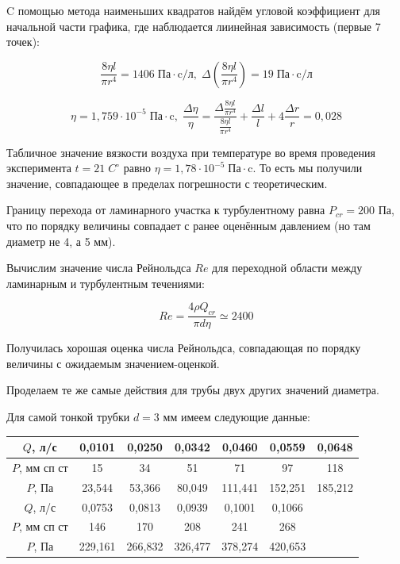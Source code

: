 \documentclass[a4paper, 12pt]{article} %
\begin{document}
C помощью метода наименьших квадратов найдём угловой коэффициент для начальной части графика, где наблюдается лиинейная зависимость (первые 7 точек):

\begin{equation}
    \frac{8\eta l}{\pi r^4} = 1406 \; \text{Па} \cdot \text{c/л}, \; \Delta \left( \frac{8\eta l}{\pi r^4} \right) = 19 \; \text{Па} \cdot \text{c/л}
\end{equation}

\begin{equation}
    \eta = 1,759 \cdot 10^{-5} \; \text{Па} \cdot \text{c}, \; \frac{\Delta \eta}{\eta} = \frac{\Delta \frac{8\eta l}{\pi r^4}}{\frac{8\eta l}{\pi r^4}} +  \frac{\Delta l}{l} + 4 \frac{\Delta r}{r} = 0,028
\end{equation}

Табличное значение вязкости воздуха при температуре во время проведения эксперимента $t = 21 \; C^{\circ}$ равно $\eta = 1,78 \cdot 10^{-5} \; \text{Па} \cdot \text{c}$. То есть мы получили значение, совпадающее в пределах погрешности с теоретическим.

Границу перехода от ламинарного участка к турбулентному равна $P_{cr} = 200$ Па, что по порядку величины совпадает с ранее оценённым давлением (но там диаметр не 4, а 5 мм).

Вычислим значение числа Рейнольдса $Re$ для переходной области между ламинарным и турбулентным течениями:

\begin{equation}
    Re = \frac{4 \rho Q_{cr}}{\pi d \eta} \simeq 2400
\end{equation}

Получилась хорошая оценка числа Рейнольдса, совпадающая по порядку величины с ожидаемым значением-оценкой.

Проделаем те же самые действия для трубы двух других значений диаметра.

Для самой тонкой трубки $d = 3$ мм имеем следующие данные:

\begin{table}[]
\begin{tabular}{|c|c|c|c|c|c|c|}
\hline
$Q$, л/с      & 0,0101  & 0,0250   & 0,0342  & 0,0460    & 0,0559   & 0,0648   \\ \hline
$P$, мм сп ст & 15       & 34      & 51       & 71       & 97       & 118      \\ \hline
$P$, Па       & 23,544   & 53,366 & 80,049  & 111,441 & 152,251 & 185,212 \\ \hline
$Q$, л/с      & 0,0753   & 0,0813  & 0,0939  & 0,1001      & 0,1066   &          \\ \hline
$P$, мм сп ст & 146      & 170     & 208      & 241      & 268      &          \\ \hline
$P$, Па       & 229,161 & 266,832 & 326,477 & 378,274 & 420,653 &          \\ \hline
\end{tabular}
\end{table}
\end{document}
